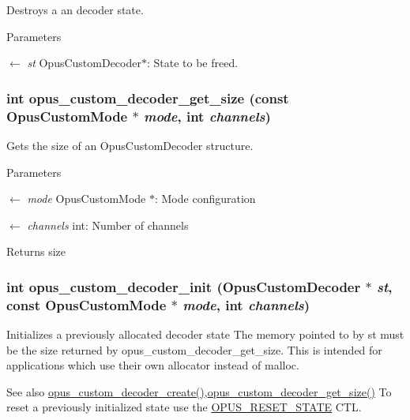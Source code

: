 Destroys a an decoder state. 
\begin{DoxyParams}{Parameters}
\item[\mbox{$\leftarrow$} {\em st}]{\ttfamily OpusCustomDecoder$\ast$}: State to be freed. \end{DoxyParams}
\hypertarget{group__opus__custom_gabe5d6f5f85dcad3ce8b88fe4b2642d2b}{
\subsubsection[{opus\_\-custom\_\-decoder\_\-get\_\-size}]{\setlength{\rightskip}{0pt plus 5cm}int opus\_\-custom\_\-decoder\_\-get\_\-size (const {\bf OpusCustomMode} $\ast$ {\em mode}, \/  int {\em channels})}}
\label{group__opus__custom_gabe5d6f5f85dcad3ce8b88fe4b2642d2b}


Gets the size of an OpusCustomDecoder structure. 
\begin{DoxyParams}{Parameters}
\item[\mbox{$\leftarrow$} {\em mode}]{\ttfamily OpusCustomMode $\ast$}: Mode configuration \item[\mbox{$\leftarrow$} {\em channels}]{\ttfamily int}: Number of channels \end{DoxyParams}
\begin{DoxyReturn}{Returns}
size 
\end{DoxyReturn}
\hypertarget{group__opus__custom_gad4cb362035313c8f77c24cd29dd0932b}{
\subsubsection[{opus\_\-custom\_\-decoder\_\-init}]{\setlength{\rightskip}{0pt plus 5cm}int opus\_\-custom\_\-decoder\_\-init ({\bf OpusCustomDecoder} $\ast$ {\em st}, \/  const {\bf OpusCustomMode} $\ast$ {\em mode}, \/  int {\em channels})}}
\label{group__opus__custom_gad4cb362035313c8f77c24cd29dd0932b}


Initializes a previously allocated decoder state The memory pointed to by st must be the size returned by opus\_\-custom\_\-decoder\_\-get\_\-size. This is intended for applications which use their own allocator instead of malloc. \begin{DoxySeeAlso}{See also}
\hyperlink{group__opus__custom_ga16e5e655999536285638cac5e80673db}{opus\_\-custom\_\-decoder\_\-create()},\hyperlink{group__opus__custom_gabe5d6f5f85dcad3ce8b88fe4b2642d2b}{opus\_\-custom\_\-decoder\_\-get\_\-size()} To reset a previously initialized state use the \hyperlink{group__opus__genericctls_gadc74e4fa8bcdf9994187d52d92207337}{OPUS\_\-RESET\_\-STATE} CTL. 
\end{DoxySeeAlso}


